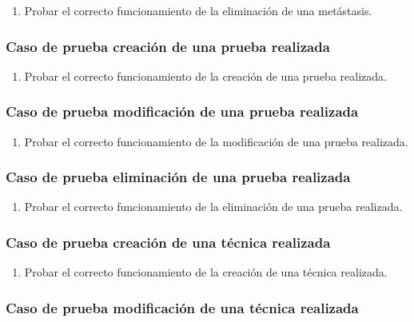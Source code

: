 \begin{enumerate}
    \item Probar el correcto funcionamiento de la eliminación de una metástasis.
\end{enumerate}

\subsubsection{Caso de prueba creación de una prueba realizada}

\begin{enumerate}
    \item Probar el correcto funcionamiento de la creación de una prueba realizada.
\end{enumerate}

\subsubsection{Caso de prueba modificación de una prueba realizada}

\begin{enumerate}
    \item Probar el correcto funcionamiento de la modificación de una prueba realizada.
\end{enumerate}

\subsubsection{Caso de prueba eliminación de una prueba realizada}

\begin{enumerate}
    \item Probar el correcto funcionamiento de la eliminación de una prueba realizada.
\end{enumerate}

\subsubsection{Caso de prueba creación de una técnica realizada}

\begin{enumerate}
    \item Probar el correcto funcionamiento de la creación de una técnica realizada.
\end{enumerate}

\subsubsection{Caso de prueba modificación de una técnica realizada}

